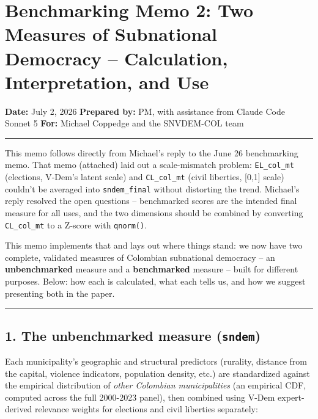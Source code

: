 \documentclass[
]{article}
\author{}
\date{\vspace{-2.5em}}
\begin{document}
\hypertarget{benchmarking-memo-2-two-measures-of-subnational-democracy-calculation-interpretation-and-use}{%
\section{Benchmarking Memo 2: Two Measures of Subnational Democracy --
Calculation, Interpretation, and
Use}\label{benchmarking-memo-2-two-measures-of-subnational-democracy-calculation-interpretation-and-use}}

\textbf{Date:} July 2, 2026 \textbf{Prepared by:} PM, with assistance
from Claude Code Sonnet 5 \textbf{For:} Michael Coppedge and the
SNVDEM-COL team

\begin{center}\rule{0.5\linewidth}{0.5pt}\end{center}

This memo follows directly from Michael's reply to the June 26
benchmarking memo. That memo (attached) laid out a scale-mismatch
problem: \texttt{EL\_col\_mt} (elections, V-Dem's latent scale) and
\texttt{CL\_col\_mt} (civil liberties, {[}0,1{]} scale) couldn't be
averaged into \texttt{sndem\_final} without distorting the trend.
Michael's reply resolved the open questions -- benchmarked scores are
the intended final measure for all uses, and the two dimensions should
be combined by converting \texttt{CL\_col\_mt} to a Z-score with
\texttt{qnorm()}.

This memo implements that and lays out where things stand: we now have
two complete, validated measures of Colombian subnational democracy --
an \textbf{unbenchmarked} measure and a \textbf{benchmarked} measure --
built for different purposes. Below: how each is calculated, what each
tells us, and how we suggest presenting both in the paper.

\begin{center}\rule{0.5\linewidth}{0.5pt}\end{center}

\hypertarget{the-unbenchmarked-measure-sndem}{%
\subsection{\texorpdfstring{1. The unbenchmarked measure
(\texttt{sndem})}{1. The unbenchmarked measure (sndem)}}\label{the-unbenchmarked-measure-sndem}}

Each municipality's geographic and structural predictors (rurality,
distance from the capital, violence indicators, population density,
etc.) are standardized against the empirical distribution of \emph{other
Colombian municipalities} (an empirical CDF, computed across the full
2000-2023 panel), then combined using V-Dem expert-derived relevance
weights for elections and civil liberties separately:
\end{document}
